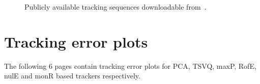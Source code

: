 \begin{figure}[h!]
									\caption{Publicly available tracking sequences downloadable from~\cite{2008_JNL_subspaceTRK_Ross}.}
									\label{fig:trk_sequences}
									\end{figure}


\clearpage
\newpage
\section{Tracking error plots}
\label{App:tracking_error_plots}
The following 6 pages contain tracking error plots for PCA, TSVQ, maxP, RofE, nulE and monR based trackers respectively.

\clearpage
\newpage
